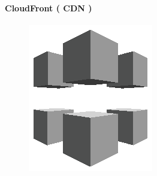 \documentclass[
12pt,
english,
ngerman,
headsepline,
twoside,
openright,
numbers=noenddot,version=first
]{scrreprt}
\begin{document}
\paragraph{CloudFront ( CDN )}
\begin{figure}
	\includegraphics[width=0.9\linewidth]{./pics/aws/NetworkingContentDelivery_GRAYSCALE_AmazonCloudFront.eps}
\end{figure}
\end{document}
